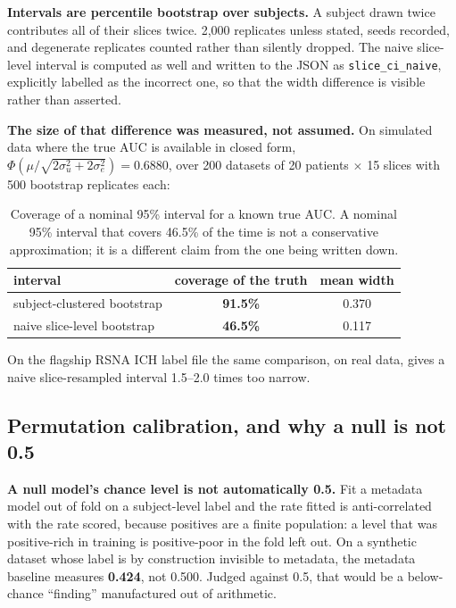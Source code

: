 \documentclass[11pt,a4paper]{article}
\begin{document}
\textbf{Intervals are percentile bootstrap over subjects.} A subject drawn twice
contributes all of their slices twice. 2{,}000 replicates unless stated, seeds
recorded, and degenerate replicates counted rather than silently dropped. The naive
slice-level interval is computed as well and written to the JSON as
\texttt{slice\_ci\_naive}, explicitly labelled as the incorrect one, so that the width
difference is visible rather than asserted.

\textbf{The size of that difference was measured, not assumed.} On simulated data
where the true AUC is available in closed form,
$\Phi\!\left(\mu / \sqrt{2\sigma_u^2 + 2\sigma_e^2}\right) = 0.6880$, over 200
datasets of 20 patients $\times$ 15 slices with 500 bootstrap replicates each:

\begin{table}[htbp]
\centering
\caption{Coverage of a nominal 95\% interval for a known true AUC. A nominal 95\%
interval that covers 46.5\% of the time is not a conservative approximation; it is a
different claim from the one being written down.}
\small
\begin{tabular}{@{}lcc@{}}
\toprule
interval & coverage of the truth & mean width \\
\midrule
subject-clustered bootstrap & \textbf{91.5\%} & 0.370 \\
naive slice-level bootstrap & \textbf{46.5\%} & 0.117 \\
\bottomrule
\end{tabular}
\end{table}

\noindent On the flagship RSNA ICH label file the same comparison, on real data, gives
a naive slice-resampled interval 1.5--2.0 times too narrow.

\subsection{Permutation calibration, and why a null is not 0.5}

\textbf{A null model's chance level is not automatically 0.5.} Fit a metadata model
out of fold on a subject-level label and the rate fitted is anti-correlated with the
rate scored, because positives are a finite population: a level that was
positive-rich in training is positive-poor in the fold left out. On a synthetic
dataset whose label is by construction invisible to metadata, the metadata baseline
measures \textbf{0.424}, not 0.500. Judged against 0.5, that would be a below-chance
``finding'' manufactured out of arithmetic.
\end{document}
